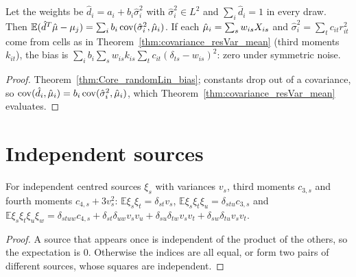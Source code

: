 \begin{corollary}\label{cor:randomLin_resVar_bias}
  \leanok
  Let the weights be $\hat d_i = a_i + b_i\hat\sigma_i^2$ with $\hat\sigma_i^2 \in L^2$ and
  $\sum_i\hat d_i = 1$ in every draw. Then $\mathbb E(\hat d^T\hat\mu - \mu_j)
  = \sum_ib_i\operatorname{cov}(\hat\sigma_i^2, \hat\mu_i)$. If each $\hat\mu_i = \sum_sw_{is}X_{is}$ and
  $\hat\sigma_i^2 = \sum_tc_{it}r_{it}^2$ come from cells as in
  Theorem~\ref{thm:covariance_resVar_mean} (third moments $k_{it}$), the bias is
  $\sum_ib_i\sum_sw_{is}k_{is}\sum_tc_{it}(\delta_{ts} - w_{is})^2$: zero under symmetric noise.
\end{corollary}
\begin{proof}
  \leanok
  Theorem~\ref{thm:Core_randomLin_bias}; constants drop out of a covariance, so
  $\operatorname{cov}(\hat d_i, \hat\mu_i) = b_i\operatorname{cov}(\hat\sigma_i^2, \hat\mu_i)$, which
  Theorem~\ref{thm:covariance_resVar_mean} evaluates.
\end{proof}

\section{Independent sources}

\begin{lemma}\label{lem:moments_indep}
  \leanok
  For independent centred sources $\xi_s$ with variances $v_s$, third moments $c_{3,s}$ and fourth
  moments $c_{4,s} + 3v_s^2$: $\mathbb E\xi_s\xi_t = \delta_{st}v_s$,
  $\mathbb E\xi_s\xi_t\xi_u = \delta_{stu}c_{3,s}$ and
  $\mathbb E\xi_s\xi_t\xi_u\xi_w = \delta_{stuw}c_{4,s} + \delta_{st}\delta_{uw}v_sv_u
  + \delta_{su}\delta_{tw}v_sv_t + \delta_{sw}\delta_{tu}v_sv_t$.
\end{lemma}
\begin{proof}
  \leanok
  A source that appears once is independent of the product of the others, so the expectation
  is $0$. Otherwise the indices are all equal, or form two pairs of different sources, whose
  squares are independent.
\end{proof}

